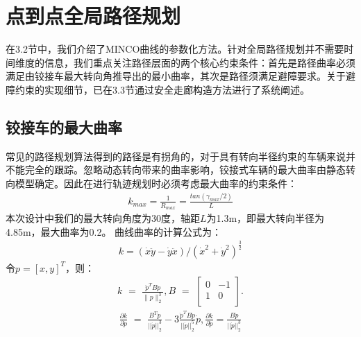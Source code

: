 \documentclass[master,academic]{ysuthesis} %
\begin{document}
	\section{点到点全局路径规划}
	在3.2节中，我们介绍了MINCO曲线的参数化方法。针对全局路径规划并不需要时间维度的信息，我们重点关注路径层面的两个核心约束条件：首先是路径曲率必须满足由铰接车最大转向角推导出的最小曲率，其次是路径须满足避障要求。关于避障约束的实现细节，已在3.3节通过安全走廊构造方法进行了系统阐述。
		\subsection{铰接车的最大曲率}
		常见的路径规划算法得到的路径是有拐角的，对于具有转向半径约束的车辆来说并不能完全的跟踪。忽略动态转向带来的曲率影响，铰接式车辆的最大曲率由静态转向模型确定。因此在进行轨迹规划时必须考虑最大曲率的约束条件：
		\begin{equation}
			\begin{aligned}
				k_{max}=\frac{1}{R_{max}}=\frac{tan( \gamma _{max}/2 )}{L}
			\end{aligned}
		\end{equation}
		本次设计中我们的最大转向角度为30度，轴距$L$为1.3m，即最大转向半径为4.85m，最大曲率为0.2。
		曲线曲率的计算公式为：
		\begin{equation}
			\begin{aligned}
				k=( \dot{x}\ddot{y}-\dot{y}\ddot{x} ) /( \dot{x}^2+\dot{y}^2 ) ^{\frac{3}{2}}
			\end{aligned}
		\end{equation}
		令$p =[x,y]^T$，则：
		\begin{equation}
			\begin{aligned}
				k\,\,=\,\,\frac{\ddot{p}^TB\dot{p}}{\lVert p \rVert _{2}^{3}},B\,\,=\,\,\left[ \begin{matrix}
					0&		-1\\
					1&		0\\
				\end{matrix} \right] .
			\end{aligned}
			\label{eq:曲线曲率k}
		\end{equation}
		\begin{equation}
			\begin{aligned}
				\frac{\partial k}{\partial \dot{p}}\,\,=\,\,\frac{B^T\ddot{p}}{||\dot{p}||_{2}^{3}}-3\frac{\ddot{p}^TB\dot{p}}{||\dot{p}||_{2}^{5}}\dot{p},\frac{\partial k}{\partial \ddot{p}}=\frac{B\dot{p}}{||\dot{p}||_{2}^{3}}
			\end{aligned}
		\end{equation}
\end{document}
